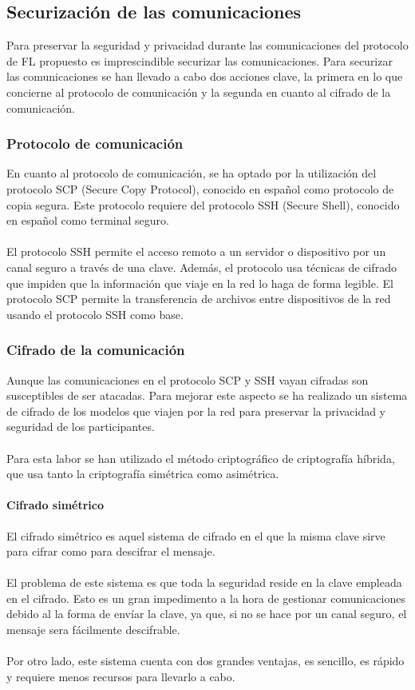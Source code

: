 \subsection{Securización de las comunicaciones} \label{SegCom}
Para preservar la seguridad y privacidad durante las comunicaciones del protocolo de FL propuesto es imprescindible securizar las comunicaciones. Para securizar las comunicaciones se han llevado a cabo dos acciones clave, la primera en lo que concierne al protocolo de comunicación y la segunda en cuanto al cifrado de la comunicación.

\subsubsection{Protocolo de comunicación}
En cuanto al protocolo de comunicación, se ha optado por la utilización del protocolo SCP (Secure Copy Protocol), conocido en español como protocolo de copia segura. Este protocolo requiere del protocolo SSH (Secure Shell), conocido en español como terminal seguro.
\\ \\
El protocolo SSH permite el acceso remoto a un servidor o dispositivo por un canal seguro a través de una clave. Además, el protocolo usa técnicas de cifrado que impiden que la información que viaje en la red lo haga de forma legible. El protocolo SCP permite la transferencia de archivos entre dispositivos de la red usando el protocolo SSH como base.

\subsubsection{Cifrado de la comunicación}
Aunque las comunicaciones en el protocolo SCP y SSH vayan cifradas son susceptibles de ser atacadas. Para mejorar este aspecto se ha realizado un sistema de cifrado de los modelos que viajen por la red para preservar la privacidad y seguridad de los participantes.
\\ \\ 
Para esta labor se han utilizado el método criptográfico de criptografía híbrida, que usa tanto la criptografía simétrica como asimétrica.

\paragraph{Cifrado simétrico} 
El cifrado simétrico es aquel sistema de cifrado en el que la misma clave sirve para cifrar como para descifrar el mensaje. 
\\ \\
El problema de este sistema es que toda la seguridad reside en la clave empleada en el cifrado. Esto es un gran impedimento a la hora de gestionar comunicaciones debido al la forma de envíar la clave, ya que, si no se hace por un canal seguro, el mensaje sera fácilmente descifrable.
\\ \\
Por otro lado, este sistema cuenta con dos grandes ventajas, es sencillo, es rápido y requiere menos recursos para llevarlo a cabo.

